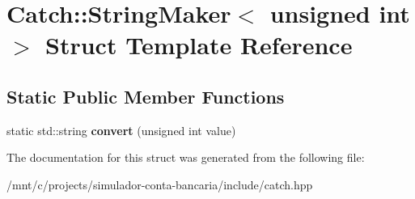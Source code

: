 \hypertarget{structCatch_1_1StringMaker_3_01unsigned_01int_01_4}{}\section{Catch\+:\+:String\+Maker$<$ unsigned int $>$ Struct Template Reference}
\label{structCatch_1_1StringMaker_3_01unsigned_01int_01_4}
\subsection*{Static Public Member Functions}
\begin{DoxyCompactItemize}
\item 
\mbox{\label{structCatch_1_1StringMaker_3_01unsigned_01int_01_4_aa0ec816ef8a65664b0524d55d08e2fd9}} 
static std\+::string {\bfseries convert} (unsigned int value)
\end{DoxyCompactItemize}


The documentation for this struct was generated from the following file\+:\begin{DoxyCompactItemize}
\item 
/mnt/c/projects/simulador-\/conta-\/bancaria/include/catch.\+hpp\end{DoxyCompactItemize}
